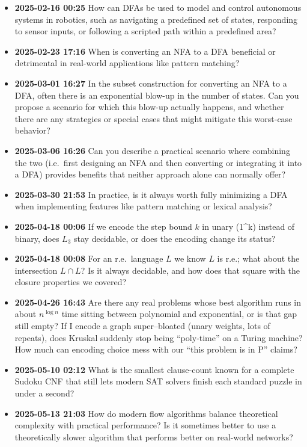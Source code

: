 \documentclass{article}
\theoremstyle{theorem}
\theoremstyle{definition}
\theoremstyle{remark}
\begin{document}
\begin{itemize}
  \item \textbf{2025-02-16 00:25}  
    How can DFAs be used to model and control autonomous systems in robotics, 
    such as navigating a predefined set of states, responding to sensor inputs, 
    or following a scripted path within a predefined area?

  \item \textbf{2025-02-23 17:16}  
    When is converting an NFA to a DFA beneficial or detrimental in real-world 
    applications like pattern matching?

  \item \textbf{2025-03-01 16:27}  
    In the subset construction for converting an NFA to a DFA, often there is an 
    exponential blow-up in the number of states. Can you propose a scenario for 
    which this blow-up actually happens, and whether there are any strategies or 
    special cases that might mitigate this worst-case behavior?

  \item \textbf{2025-03-06 16:26}  
    Can you describe a practical scenario where combining the two (i.e.\ first designing 
    an NFA and then converting or integrating it into a DFA) provides benefits that 
    neither approach alone can normally offer?

  \item \textbf{2025-03-30 21:53}  
    In practice, is it always worth fully minimizing a DFA when implementing features like 
    pattern matching or lexical analysis?

  \item \textbf{2025-04-18 00:06}  
    If we encode the step bound \(k\) in unary (1\^{}k) instead of binary, does \(L_3\) stay 
    decidable, or does the encoding change its status?

  \item \textbf{2025-04-18 00:08}  
    For an r.e.\ language \(L\) we know \(L\) is r.e.; what about the intersection \(L\cap L\)? 
    Is it always decidable, and how does that square with the closure properties we covered?

  \item \textbf{2025-04-26 16:43}  
    Are there any real problems whose best algorithm runs in about \(n^{\log n}\) time 
    sitting between polynomial and exponential, or is that gap still empty? If I encode a 
    graph super–bloated (unary weights, lots of repeats), does Kruskal suddenly stop being 
    “poly‐time” on a Turing machine? How much can encoding choice mess with our “this 
    problem is in P” claims?

  \item \textbf{2025-05-10 02:12}  
    What is the smallest clause‐count known for a complete Sudoku CNF that still lets modern 
    SAT solvers finish each standard puzzle in under a second?

  \item \textbf{2025-05-13 21:03}  
    How do modern flow algorithms balance theoretical complexity with practical performance? 
    Is it sometimes better to use a theoretically slower algorithm that performs better on 
    real-world networks?
\end{itemize}
\end{document}

